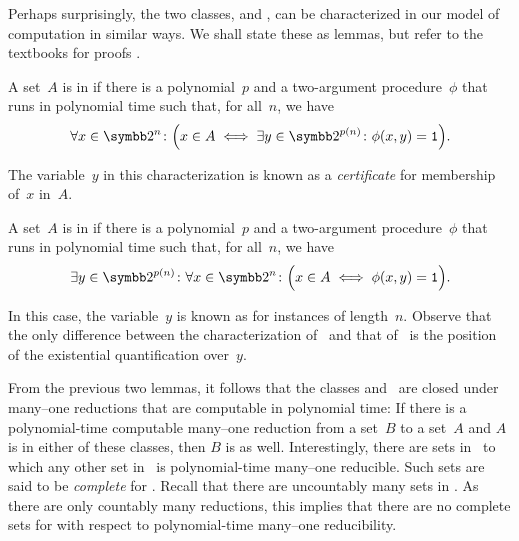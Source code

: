 Perhaps surprisingly, the two classes,  and , can be characterized in our model of computation in similar ways.
We shall state these as lemmas, but refer to the textbooks for proofs \parencites(for~:)()[Section~2.1]{arora2009computational}[and][Section~2.1.5]{goldreich2008computational} \parencites(for~:)()[Section~6.3]{arora2009computational}[and][Section~3.1]{goldreich2008computational}.
\begin{lemma}
  A set~$A$ is in  if there is a polynomial~$p$ and a two-argument procedure~$\phi$ that runs in polynomial time such that, for all~$n$, we have
  \begin{equation*}
    \forall x \in \binary^n\colon \Big(x \in A \iff \exists y \in \binary^{p(n)}\colon \phi(x, y) = \bits{1}\Big).
  \end{equation*}
\end{lemma}
The variable~$y$ in this characterization is known as a \emph{certificate} for membership of~$x$ in~$A$.
\begin{lemma}
  A set~$A$ is in  if there is a polynomial~$p$ and a two-argument procedure~$\phi$ that runs in polynomial time such that, for all~$n$, we have
  \begin{equation*}
    \exists y \in \binary^{p(n)}\colon \forall x \in \binary^n\colon \Big(x \in A \iff \phi(x, y) = \bits{1}\Big).
  \end{equation*}
\end{lemma}
In this case, the variable~$y$ is known as  for instances of length~$n$.
Observe that the only difference between the characterization of~ and that of~ is the position of the existential quantification over~$y$.

From the previous two lemmas, it follows that the classes  and~ are closed under many--one reductions that are computable in polynomial time:
If there is a polynomial-time computable many--one reduction from a set~$B$ to a set~$A$ and $A$ is in either of these classes, then $B$ is as well.
Interestingly, there are sets in~ to which any other set in~ is polynomial-time many--one reducible.
Such sets are said to be \emph{complete} for .
Recall that there are uncountably many sets in .
As there are only countably many reductions, this implies that there are no complete sets for  with respect to polynomial-time many--one reducibility.

